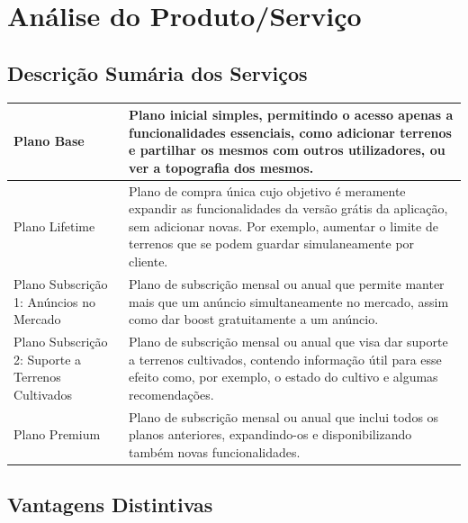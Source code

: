 \documentclass[11pt]{article}
\begin{document}
	\pagebreak
	
	\large
	\section{Análise do Produto/Serviço}
	
	\normalsize
	
	\large
	\subsection{Descrição Sumária dos Serviços}
	
	\normalsize
	
	\begin{center}
		\begin{tabularx}{\linewidth}{ | p{} | X | }
			\hline
			Plano Base & Plano inicial simples, permitindo o acesso apenas a funcionalidades essenciais, como adicionar terrenos e partilhar os mesmos com outros utilizadores, ou ver a topografia dos mesmos. \\
			\hline
			Plano Lifetime & Plano de compra única cujo objetivo é meramente expandir as funcionalidades da versão grátis da aplicação, sem adicionar novas. Por exemplo, aumentar o limite de terrenos que se podem guardar simulaneamente por cliente. \\
			\hline
			Plano Subscrição 1: Anúncios no Mercado & Plano de subscrição mensal ou anual que permite manter mais que um anúncio simultaneamente no mercado, assim como dar boost gratuitamente a um anúncio. \\
			\hline 
			Plano Subscrição 2: Suporte a Terrenos Cultivados & Plano de subscrição mensal ou anual que visa dar suporte a terrenos cultivados, contendo informação útil para esse efeito como, por exemplo, o estado do cultivo e algumas recomendações. \\
			\hline   
			Plano Premium & Plano de subscrição mensal ou anual que inclui todos os planos anteriores, expandindo-os e disponibilizando também novas funcionalidades.  \\
			\hline
		\end{tabularx}
	\end{center}
	
	\large
	\subsection{Vantagens Distintivas}
	
	\normalsize
	
\end{document}
